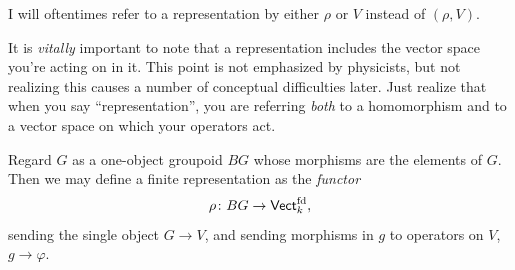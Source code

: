 \documentclass[11pt]{article}
\begin{document}
\begin{nnote}
    I will oftentimes refer to a representation by either $\rho$
    or $V$ instead of $(\rho, V)$.
\end{nnote}

\begin{reemark}
    It is \emph{vitally} important to note that a representation includes the
    vector space you're acting on in it. This point is not emphasized by
    physicists, but not realizing this causes a number of conceptual
    difficulties later. Just realize that when you say ``representation'',
    you are referring \emph{both} to a homomorphism and to a vector space
    on which your operators act.
\end{reemark}

\begin{nnote}
    Regard $G$ as a one-object groupoid $BG$ whose morphisms
    are the elements of $G$. Then we may define a finite representation 
    as the \emph{functor}
    \begin{align*}
        \rho \colon BG \to \text{\sffamily{Vect}}_k^{\rm fd},
    \end{align*}
    sending the single object $G \to V$, and sending morphisms
    in $g$ to operators on $V$, $g \to \varphi$.
\end{nnote}
\end{document}
